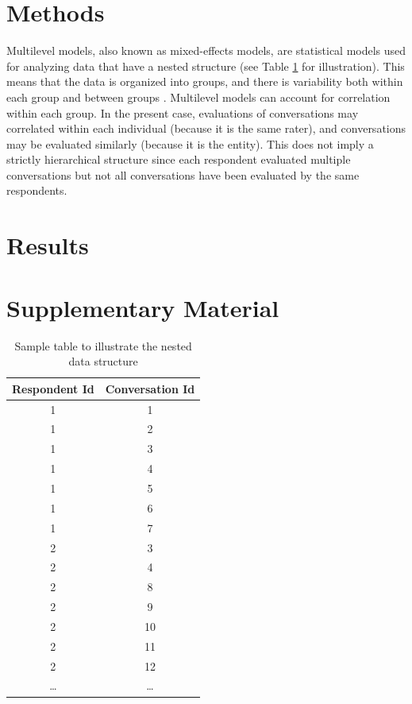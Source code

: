 \documentclass{article}
\begin{document}
\clearpage

\section{Methods}

Multilevel models, also known as mixed-effects models, are statistical models used for analyzing data that have a nested structure (see Table \ref{sample-table}  for illustration). This means that the data is organized into groups, and there is variability both within each group and between groups \citep{hox2017multilevel}. Multilevel models can account for correlation within each group. In the present case, evaluations of conversations may correlated within each individual (because it is the same rater), and conversations may be evaluated similarly (because it is the entity). This does not imply a strictly hierarchical structure since each respondent evaluated multiple conversations but not all conversations have been evaluated by the same respondents. 


\section{Results}











\newpage



\clearpage
\section{Supplementary Material}

\begin{table}[htbp]
    \centering
    \begin{tabular}{|c|c|}
    \hline
    \textbf{Respondent Id} & \textbf{Conversation Id} \\
    \hline
    1 & 1 \\
    1 & 2 \\
    1 & 3 \\
    1 & 4 \\
    1 & 5 \\
    1 & 6 \\
    1 & 7 \\
    \midrule
    2 & 3 \\
    2 & 4 \\
    2 & 8 \\
    2 & 9 \\
    2 & 10 \\
    2 & 11 \\
    2 & 12 \\
    \dots & \dots \\
    \hline
    \end{tabular}
    \caption{Sample table to illustrate the nested data structure}
    \label{sample-table}
\end{table}
\end{document}
